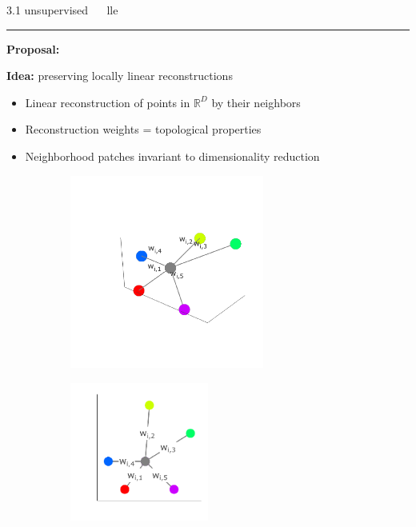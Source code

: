 \documentclass[11pt, compress, t, notes = noshow, xcolor = table, 
aspectratio = 1610]{beamer}
\newcommand{\highlight}[1]{\textcolor{highlightcol}{\textbf{#1}}}
\newcommand{\arritem}{\item[\highlight{$\rightarrow$}]}
\newcommand{\RD}{\mathbb{R}^D}
\begin{document}

\LARGE
\begin{frame}{\textcolor{gray!90}{3.1 unsupervised} ~~ lle}
\normalsize
\vspace{-0.5cm}
\noindent \textcolor{gray!90}{\rule{\textwidth}{1pt}}
\smallskip

\textbf{Proposal:} \citet{roweissaul2000}

\vspace{0.3cm}

\textbf{Idea:} preserving locally linear reconstructions 

\begin{itemize}
  \arritem Linear reconstruction of points in $\RD$ by their neighbors
  \arritem Reconstruction weights = topological properties
  \arritem Neighborhood patches invariant to dimensionality reduction
\end{itemize}

\vspace{0.3cm}

\begin{figure}[H]
 \begin{subfigure}[b]{0.48\textwidth}
   \includegraphics[trim = 50 50 20 60, clip, %
   width = 0.7\textwidth]{figures/reconstruction_3d}
 \end{subfigure}
 \hfill
 \begin{subfigure}[b]{0.48\textwidth}
   \includegraphics[trim = 40 30 0 20, clip, %
   width = 0.5\textwidth]{figures/reconstruction_2d}
 \end{subfigure}
\end{figure}


\end{frame}
\end{document}

